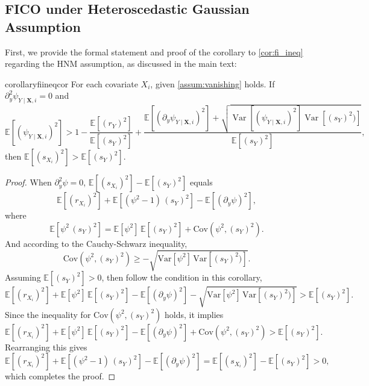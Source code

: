 \documentclass{article}
\theoremstyle{plain}
\theoremstyle{definition}
\theoremstyle{remark}
\begin{document}
\subsection{FICO under Heteroscedastic Gaussian Assumption}
\label{app:b_heteroscedastic}

First, we provide the formal statement and proof of the corollary to \cref{cor:fi_ineq} regarding the HNM assumption, as discussed in the main text:

\begin{restatable}{corollary}{fiineqcor}
\label{cor:fi_ineq_cor}
For each covariate $X_i$, given \cref{assum:vanishing} holds.
If $\partial^2_{y}\psi_{Y\mid\bm{X},i}=0$ and
\[\mathbb{E}\left[(\psi_{Y\mid\bm{X},i})^2\right]>1-\frac{\mathbb{E}\left[(r_Y)^2\right]}{\mathbb{E}\left[(s_Y)^2\right]}+\frac{\mathbb{E}\left[(\partial_{y}\psi_{Y\mid\bm{X},i})^2\right]+\sqrt{\mathop{\text{Var}}\left[(\psi_{Y\mid\bm{X},i})^2\right]\mathop{\text{Var}}\left[(s_Y)^2)\right]}}{\mathbb{E}\left[(s_Y)^2\right]},\]
then $\mathbb{E}\left[(s_{X_i})^2\right]>\mathbb{E}\left[(s_{Y})^2\right]$.
\end{restatable}

\begin{proof}
When $\partial^2_{y}\psi=0$, $\mathbb{E}\left[(s_{X_i})^2\right]-\mathbb{E}\left[(s_{Y})^2\right]$ equals
\[\mathbb{E}\left[(r_{X_i})^2\right]+\mathbb{E}\left[(\psi^2-1)\,(s_Y)^2\right]-\mathbb{E}\left[(\partial_{y}\psi)^2\right],\]
where
\[\mathbb{E}\left[\psi^2\,(s_Y)^2\right]=\mathbb{E}\left[\psi^2\right]\,\mathbb{E}\left[(s_Y)^2\right]+\text{Cov}\left(\psi^2,(s_Y)^2\right).\]
And according to the Cauchy-Schwarz inequality,
\[\text{Cov}\left(\psi^2,(s_Y)^2\right)\ge-\sqrt{\text{Var}\left[\psi^2\right]\,\text{Var}\left[(s_Y)^2)\right]}.\]
Assuming $\mathbb{E}\left[(s_Y)^2\right]>0$, then follow the condition in this corollary,
\[\mathbb{E}\left[(r_{X_i})^2\right]+\mathbb{E}\left[\psi^2\right]\,\mathbb{E}\left[(s_Y)^2\right]-\mathbb{E}\left[(\partial_{y}\psi)^2\right]-\sqrt{\text{Var}\left[\psi^2\right]\,\text{Var}\left[(s_Y)^2)\right]}>\mathbb{E}[(s_Y)^2].\]
Since the inequality for $\text{Cov}\left(\psi^2,(s_Y)^2\right)$ holds, it implies
\[\mathbb{E}\left[(r_{X_i})^2\right]+\mathbb{E}\left[\psi^2\right]\,\mathbb{E}\left[(s_Y)^2\right]-\mathbb{E}\left[(\partial_{y}\psi)^2\right]+\text{Cov}\left(\psi^2,(s_Y)^2\right)>\mathbb{E}[(s_Y)^2].\]
Rearranging this gives
\[\mathbb{E}\left[(r_{X_i})^2\right]+\mathbb{E}\left[(\psi^2-1)\,(s_Y)^2\right]-\mathbb{E}\left[(\partial_{y}\psi)^2\right]=\mathbb{E}\left[(s_{X_i})^2\right]-\mathbb{E}\left[(s_{Y})^2\right]>0,\]
which completes the proof.
\end{proof}
\end{document}
